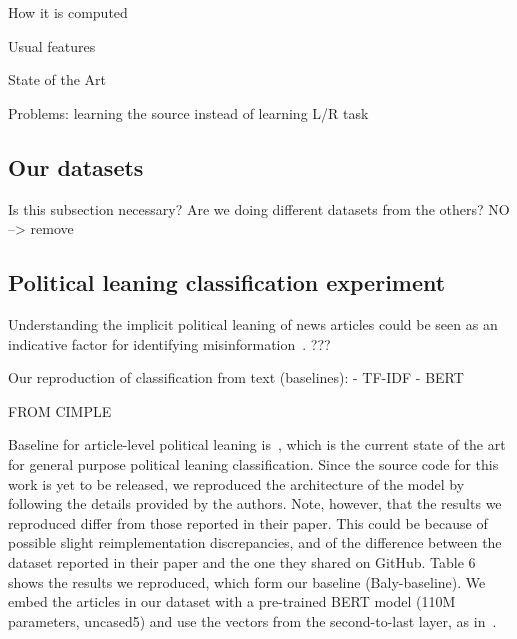 How it is computed

Usual features

State of the Art

Problems: learning the source instead of learning L/R task

\subsection{Our datasets}
\label{ssec:ps_leaning_our_data}

Is this subsection necessary? Are we doing different datasets from the others? NO --> remove

\subsection{Political leaning classification experiment}
\label{ssec:ps_leaning_classifier}

Understanding the implicit political leaning of news articles could be seen as an indicative factor for identifying misinformation~\citep{spezzano2021s}. ???

Our reproduction of classification from text (baselines):
- TF-IDF
- BERT

FROM CIMPLE

Baseline for article-level political leaning is~\citet{baly2020we}, which is the current state of the art for general purpose political leaning classification. Since the source code for this work is yet to be released, we reproduced the architecture of the model by following the details provided by the authors. Note, however, that the results we reproduced differ from those reported in their paper. This could be because of possible slight reimplementation discrepancies, and of the difference between the dataset reported in their paper and the one they shared on GitHub. Table 6 shows the results we reproduced, which form our baseline (Baly-baseline).
We embed the articles in our dataset with a pre-trained BERT model (110M parameters, uncased5) and use the vectors from the second-to-last layer, as in~\citet{baly2020we}.

